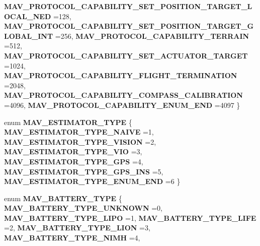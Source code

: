 \begin{DoxyCompactItemize}
\textbf{ M\+A\+V\+\_\+\+P\+R\+O\+T\+O\+C\+O\+L\+\_\+\+C\+A\+P\+A\+B\+I\+L\+I\+T\+Y\+\_\+\+S\+E\+T\+\_\+\+P\+O\+S\+I\+T\+I\+O\+N\+\_\+\+T\+A\+R\+G\+E\+T\+\_\+\+L\+O\+C\+A\+L\+\_\+\+N\+ED} =128, 
\newline
\textbf{ M\+A\+V\+\_\+\+P\+R\+O\+T\+O\+C\+O\+L\+\_\+\+C\+A\+P\+A\+B\+I\+L\+I\+T\+Y\+\_\+\+S\+E\+T\+\_\+\+P\+O\+S\+I\+T\+I\+O\+N\+\_\+\+T\+A\+R\+G\+E\+T\+\_\+\+G\+L\+O\+B\+A\+L\+\_\+\+I\+NT} =256, 
\textbf{ M\+A\+V\+\_\+\+P\+R\+O\+T\+O\+C\+O\+L\+\_\+\+C\+A\+P\+A\+B\+I\+L\+I\+T\+Y\+\_\+\+T\+E\+R\+R\+A\+IN} =512, 
\textbf{ M\+A\+V\+\_\+\+P\+R\+O\+T\+O\+C\+O\+L\+\_\+\+C\+A\+P\+A\+B\+I\+L\+I\+T\+Y\+\_\+\+S\+E\+T\+\_\+\+A\+C\+T\+U\+A\+T\+O\+R\+\_\+\+T\+A\+R\+G\+ET} =1024, 
\textbf{ M\+A\+V\+\_\+\+P\+R\+O\+T\+O\+C\+O\+L\+\_\+\+C\+A\+P\+A\+B\+I\+L\+I\+T\+Y\+\_\+\+F\+L\+I\+G\+H\+T\+\_\+\+T\+E\+R\+M\+I\+N\+A\+T\+I\+ON} =2048, 
\newline
\textbf{ M\+A\+V\+\_\+\+P\+R\+O\+T\+O\+C\+O\+L\+\_\+\+C\+A\+P\+A\+B\+I\+L\+I\+T\+Y\+\_\+\+C\+O\+M\+P\+A\+S\+S\+\_\+\+C\+A\+L\+I\+B\+R\+A\+T\+I\+ON} =4096, 
\textbf{ M\+A\+V\+\_\+\+P\+R\+O\+T\+O\+C\+O\+L\+\_\+\+C\+A\+P\+A\+B\+I\+L\+I\+T\+Y\+\_\+\+E\+N\+U\+M\+\_\+\+E\+ND} =4097
 \}
\item 
enum \textbf{ M\+A\+V\+\_\+\+E\+S\+T\+I\+M\+A\+T\+O\+R\+\_\+\+T\+Y\+PE} \{ \newline
\textbf{ M\+A\+V\+\_\+\+E\+S\+T\+I\+M\+A\+T\+O\+R\+\_\+\+T\+Y\+P\+E\+\_\+\+N\+A\+I\+VE} =1, 
\textbf{ M\+A\+V\+\_\+\+E\+S\+T\+I\+M\+A\+T\+O\+R\+\_\+\+T\+Y\+P\+E\+\_\+\+V\+I\+S\+I\+ON} =2, 
\textbf{ M\+A\+V\+\_\+\+E\+S\+T\+I\+M\+A\+T\+O\+R\+\_\+\+T\+Y\+P\+E\+\_\+\+V\+IO} =3, 
\textbf{ M\+A\+V\+\_\+\+E\+S\+T\+I\+M\+A\+T\+O\+R\+\_\+\+T\+Y\+P\+E\+\_\+\+G\+PS} =4, 
\newline
\textbf{ M\+A\+V\+\_\+\+E\+S\+T\+I\+M\+A\+T\+O\+R\+\_\+\+T\+Y\+P\+E\+\_\+\+G\+P\+S\+\_\+\+I\+NS} =5, 
\textbf{ M\+A\+V\+\_\+\+E\+S\+T\+I\+M\+A\+T\+O\+R\+\_\+\+T\+Y\+P\+E\+\_\+\+E\+N\+U\+M\+\_\+\+E\+ND} =6
 \}
\item 
enum \textbf{ M\+A\+V\+\_\+\+B\+A\+T\+T\+E\+R\+Y\+\_\+\+T\+Y\+PE} \{ \newline
\textbf{ M\+A\+V\+\_\+\+B\+A\+T\+T\+E\+R\+Y\+\_\+\+T\+Y\+P\+E\+\_\+\+U\+N\+K\+N\+O\+WN} =0, 
\textbf{ M\+A\+V\+\_\+\+B\+A\+T\+T\+E\+R\+Y\+\_\+\+T\+Y\+P\+E\+\_\+\+L\+I\+PO} =1, 
\textbf{ M\+A\+V\+\_\+\+B\+A\+T\+T\+E\+R\+Y\+\_\+\+T\+Y\+P\+E\+\_\+\+L\+I\+FE} =2, 
\textbf{ M\+A\+V\+\_\+\+B\+A\+T\+T\+E\+R\+Y\+\_\+\+T\+Y\+P\+E\+\_\+\+L\+I\+ON} =3, 
\newline
\textbf{ M\+A\+V\+\_\+\+B\+A\+T\+T\+E\+R\+Y\+\_\+\+T\+Y\+P\+E\+\_\+\+N\+I\+MH} =4, 

\end{DoxyCompactItemize}
